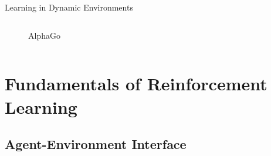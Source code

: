 \documentclass[xcolor=dvipsnames]{beamer}
\begin{document}
\begin{frame}{Learning in Dynamic Environments}
\begin{columns}
\begin{column}{0.5\textwidth}
\begin{figure}
                \caption{AlphaGo \cite{silver_mastering_2016}}
                \label{fig:autonomous-driving}
            \end{figure}
        \end{column}
    \end{columns}
\end{frame}


\section{Fundamentals of Reinforcement Learning}
\subsection{Agent-Environment Interface}
\end{document}
